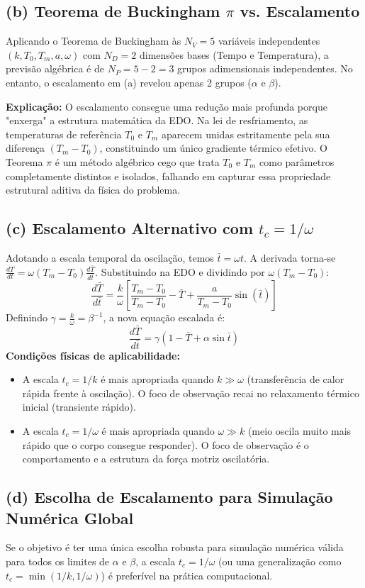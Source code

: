 \documentclass{article}
\begin{document}
\subsection*{(b) Teorema de Buckingham $\pi$ vs. Escalamento}
Aplicando o Teorema de Buckingham às $N_V = 5$ variáveis independentes $(k, T_0, T_m, a, \omega)$ com $N_D = 2$ dimensões bases (Tempo e Temperatura), a previsão algébrica é de $N_P = 5 - 2 = 3$ grupos adimensionais independentes. No entanto, o escalamento em (a) revelou apenas 2 grupos ($\alpha$ e $\beta$).

\textbf{Explicação:} O escalamento consegue uma redução mais profunda porque "enxerga" a estrutura matemática da EDO. Na lei de resfriamento, as temperaturas de referência $T_0$ e $T_m$ aparecem unidas estritamente pela sua diferença $(T_m - T_0)$, constituindo um único gradiente térmico efetivo. O Teorema $\pi$ é um método algébrico cego que trata $T_0$ e $T_m$ como parâmetros completamente distintos e isolados, falhando em capturar essa propriedade estrutural aditiva da física do problema.

\subsection*{(c) Escalamento Alternativo com $t_c = 1/\omega$}
Adotando a escala temporal da oscilação, temos $\bar{t} = \omega t$.
A derivada torna-se $\frac{dT}{dt} = \omega(T_m - T_0)\frac{d\bar{T}}{d\bar{t}}$. Substituindo na EDO e dividindo por $\omega(T_m - T_0)$:
\[ \frac{d\bar{T}}{d\bar{t}} = \frac{k}{\omega} \left[ \frac{T_m - T_0}{T_m - T_0} - \bar{T} + \frac{a}{T_m - T_0}\sin(\bar{t}) \right] \]
Definindo $\gamma = \frac{k}{\omega} = \beta^{-1}$, a nova equação escalada é:
\[ \frac{d\bar{T}}{d\bar{t}} = \gamma (1 - \bar{T} + \alpha \sin \bar{t}) \]
\textbf{Condições físicas de aplicabilidade:}
\begin{itemize}
    \item A escala $t_c = 1/k$ é mais apropriada quando $k \gg \omega$ (transferência de calor rápida frente à oscilação). O foco de observação recai no relaxamento térmico inicial (transiente rápido).
    \item A escala $t_c = 1/\omega$ é mais apropriada quando $\omega \gg k$ (meio oscila muito mais rápido que o corpo consegue responder). O foco de observação é o comportamento e a estrutura da força motriz oscilatória.
\end{itemize}

\subsection*{(d) Escolha de Escalamento para Simulação Numérica Global}
Se o objetivo é ter uma única escolha robusta para simulação numérica válida para todos os limites de $\alpha$ e $\beta$, a escala \textbf{$t_c = 1/\omega$} (ou uma generalização como $t_c = \min(1/k, 1/\omega)$) é preferível na prática computacional. 
\end{document}
